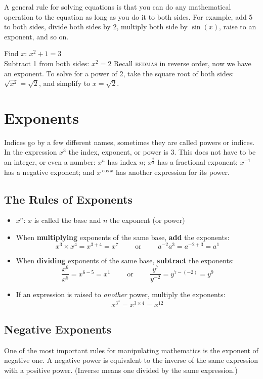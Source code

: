 \begin{tcolorbox}
A general rule for solving equations is that you can do any mathematical operation to the equation as long as you do it to both sides. For example, add 5 to both sides, divide both sides by 2, multiply both side by $\sin(x)$, raise to an exponent, and so on.
\end{tcolorbox}
\clearpage
\example Find $x$: $x^2+1=3$\medskip\\
\solution Subtract 1 from both sides: $x^2=2$ Recall \textsc{bedmas} in reverse order, now we have an exponent. To solve for a power of 2, take the square root of both sides: $\sqrt{x^2}=\sqrt{2}$, and simplify to $x=\sqrt{2}$.
\section*{Exponents}
Indices go by a few different names, sometimes they are called powers or indices. In the expression $x^3$ the index, exponent, or power is $3$. This does not have to be an integer, or even a number: $x^n$ has index $n$; $x^{\frac{2}{3}}$ has a fractional exponent; $x^{-1}$ has a negative exponent; and $x^{\cos x}$ has another expression for its power.

\subsection*{The Rules of Exponents}
\begin{tcolorbox}
	\begin{itemize}
		\item $x^n$: $x$ is called the base and $n$ the exponent (or power)
		\item When \textbf{multiplying} exponents of the same base, \textbf{add} the exponents: \[x^3\times x^4=x^{3+4}=x^7\qquad\text{ or }\qquad a^{-2} a^3=a^{-2+3}=a^1\]
		\item When \textbf{dividing} exponents of the same base, \textbf{subtract} the exponents:\[\frac{x^6}{x^5}=x^{6-5}=x^1\qquad\text{ or }\qquad \frac{y^7}{y^{-2}}=y^{7-(-2)}=y^9\]
		\item If an expression is raised to \textit{another} power, multiply the exponents:
		\[ x^{3^4}=x^{3\times 4}=x^{12}\]
	\end{itemize}
\end{tcolorbox}	

\subsection*{Negative Exponents}
One of the most important rules for manipulating mathematics is the exponent of negative one. A negative power is equivalent to the inverse of the same expression with a positive power. (Inverse means one divided by the same expression.)\\


